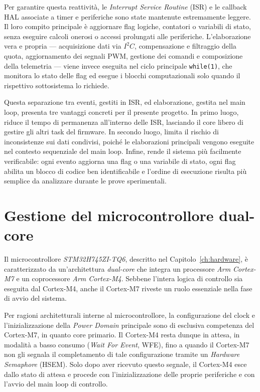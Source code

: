 \documentclass[11pt]{report}
\begin{document}
Per garantire questa reattività, le \textit{Interrupt Service Routine} (ISR) e le callback HAL associate a timer e periferiche sono state mantenute estremamente leggere. Il loro compito principale è aggiornare flag logiche, contatori o variabili di stato, senza eseguire calcoli onerosi o accessi prolungati alle periferiche. L'elaborazione vera e propria — acquisizione dati via $I^{2}C$, compensazione e filtraggio della quota, aggiornamento dei segnali PWM, gestione dei comandi e composizione della telemetria — viene invece eseguita nel ciclo principale \texttt{while(1)}, che monitora lo stato delle flag ed esegue i blocchi computazionali solo quando il rispettivo sottosistema lo richiede.

Questa separazione tra eventi, gestiti in ISR, ed elaborazione, gestita nel main loop, presenta tre vantaggi concreti per il presente progetto. In primo luogo, riduce il tempo di permanenza all'interno delle ISR, lasciando il core libero di gestire gli altri task del firmware. In secondo luogo, limita il rischio di inconsistenze sui dati condivisi, poiché le elaborazioni principali vengono eseguite nel contesto sequenziale del main loop. Infine, rende il sistema più facilmente verificabile: ogni evento aggiorna una flag o una variabile di stato, ogni flag abilita un blocco di codice ben identificabile e l'ordine di esecuzione risulta più semplice da analizzare durante le prove sperimentali.

\section{Gestione del microcontrollore dual-core}
Il microcontrollore \textit{STM32H745ZI-TQ6}, descritto nel Capitolo~\ref{ch:hardware}, è caratterizzato da un'architettura \textit{dual-core} che integra un processore \textit{Arm Cortex-M7} e un coprocessore \textit{Arm Cortex-M4}. Sebbene l'intera logica di controllo sia eseguita dal Cortex-M4, anche il Cortex-M7 riveste un ruolo essenziale nella fase di avvio del sistema.

Per ragioni architetturali interne al microcontrollore, la configurazione del clock e l'inizializzazione della \textit{Power Domain} principale sono di esclusiva competenza del Cortex-M7, in quanto core primario. Il Cortex-M4 resta dunque in attesa, in modalità a basso consumo (\textit{Wait For Event}, WFE), fino a quando il Cortex-M7 non gli segnala il completamento di tale configurazione tramite un \textit{Hardware Semaphore} (HSEM). Solo dopo aver ricevuto questo segnale, il Cortex-M4 esce dallo stato di attesa e procede con l'inizializzazione delle proprie periferiche e con l'avvio del main loop di controllo.
\end{document}
